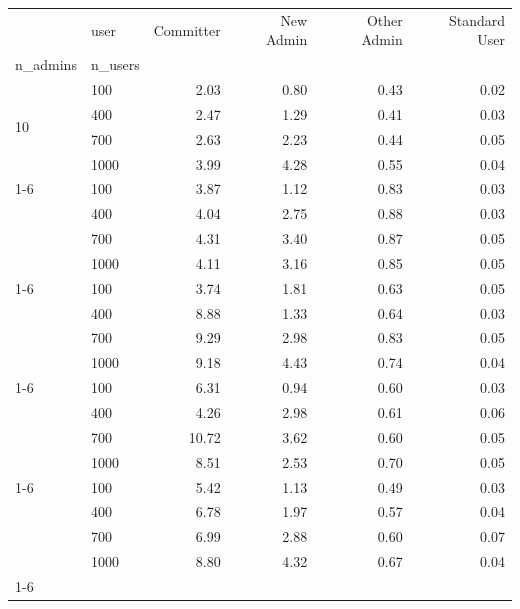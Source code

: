 \begin{tabular}{llrrrr}
\toprule
 & user & Committer & New Admin & Other Admin & Standard User \\
n_admins & n_users &  &  &  &  \\
\midrule
\multirow[t]{4}{*}{10} & 100 & 2.03 & 0.80 & 0.43 & 0.02 \\
                        & 400 & 2.47 & 1.29 & 0.41 & 0.03 \\
                        & 700 & 2.63 & 2.23 & 0.44 & 0.05 \\
                        & 1000 & 3.99 & 4.28 & 0.55 & 0.04 \\
\cline{1-6}
\multirow[t]{4}{*}{50} & 100 & 3.87 & 1.12 & 0.83 & 0.03 \\
                        & 400 & 4.04 & 2.75 & 0.88 & 0.03 \\
                        & 700 & 4.31 & 3.40 & 0.87 & 0.05 \\
                        & 1000 & 4.11 & 3.16 & 0.85 & 0.05 \\
\cline{1-6}
\multirow[t]{4}{*}{100} & 100 & 3.74 & 1.81 & 0.63 & 0.05 \\
                        & 400 & 8.88 & 1.33 & 0.64 & 0.03 \\
                        & 700 & 9.29 & 2.98 & 0.83 & 0.05 \\
                        & 1000 & 9.18 & 4.43 & 0.74 & 0.04 \\
\cline{1-6}
\multirow[t]{4}{*}{150} & 100 & 6.31 & 0.94 & 0.60 & 0.03 \\
                        & 400 & 4.26 & 2.98 & 0.61 & 0.06 \\
                        & 700 & 10.72 & 3.62 & 0.60 & 0.05 \\
                        & 1000 & 8.51 & 2.53 & 0.70 & 0.05 \\
\cline{1-6}
\multirow[t]{4}{*}{200} & 100 & 5.42 & 1.13 & 0.49 & 0.03 \\
                        & 400 & 6.78 & 1.97 & 0.57 & 0.04 \\
                        & 700 & 6.99 & 2.88 & 0.60 & 0.07 \\
                        & 1000 & 8.80 & 4.32 & 0.67 & 0.04 \\
\cline{1-6}
\bottomrule
\end{tabular}
